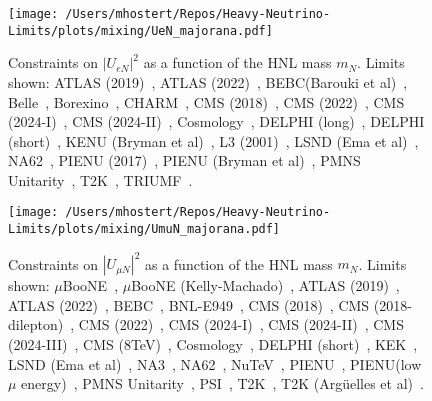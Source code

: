 \documentclass{revtex4-1}%
\begin{document}
%
\normalsize%


\begin{figure}[h!]%
\centering%
\texttt{[image: /Users/mhostert/Repos/Heavy-Neutrino-Limits/plots/mixing/UeN\_majorana.pdf]}%
\caption{Constraints on $|U_{e N}|^2$ as a function of the HNL mass $m_N$. Limits shown: ATLAS (2019)~\cite{ATLAS:2019kpx}, ATLAS (2022)~\cite{ATLAS:2022atq}, BEBC(Barouki et al)~\cite{Barouki:2022bkt}, Belle~\cite{Belle:2013ytx}, Borexino~\cite{Borexino:2013bot}, CHARM~\cite{CHARM:1985nku}, CMS (2018)~\cite{CMS:2018iaf}, CMS (2022)~\cite{CMS:2022fut}, CMS (2024-I)~\cite{CMS:2024ake}, CMS (2024-II)~\cite{CMS:2024xdq}, Cosmology~\cite{Sabti:2020yrt}, DELPHI (long)~\cite{DELPHI:1996qcc}, DELPHI (short)~\cite{DELPHI:1996qcc}, KENU (Bryman et al)~\cite{Bryman:2019bjg}, L3 (2001)~\cite{L3:2001zfe}, LSND (Ema et al)~\cite{Ema:2023buz}, NA62~\cite{NA62:2020mcv}, PIENU (2017)~\cite{PIENU:2017wbj}, PIENU (Bryman et al)~\cite{Bryman:2019bjg}, PMNS Unitarity~\cite{Blennow:2023mqx}, T2K~\cite{T2K:2019jwa}, TRIUMF~\cite{Britton:1992xv}.}%
\end{figure}

%


\begin{figure}[h!]%
\centering%
\texttt{[image: /Users/mhostert/Repos/Heavy-Neutrino-Limits/plots/mixing/UmuN\_majorana.pdf]}%
\caption{Constraints on $|U_{\mu N}|^2$ as a function of the HNL mass $m_N$. Limits shown: $\mu$BooNE~\cite{MicroBooNE:2023icy}, $\mu$BooNE (Kelly-Machado)~\cite{Kelly:2021xbv}, ATLAS (2019)~\cite{ATLAS:2019kpx}, ATLAS (2022)~\cite{ATLAS:2022atq}, BEBC~\cite{WA66:1985mfx}, BNL-E949~\cite{E949:2014gsn}, CMS (2018)~\cite{CMS:2018iaf}, CMS (2018-dilepton)~\cite{CMS:2018jxx}, CMS (2022)~\cite{CMS:2022fut}, CMS (2024-I)~\cite{CMS:2024ake}, CMS (2024-II)~\cite{CMS:2024xdq}, CMS (2024-III)~\cite{CMS:2024ita}, CMS (8TeV)~\cite{CMS:2016aro}, Cosmology~\cite{Sabti:2020yrt}, DELPHI (short)~\cite{DELPHI:1996qcc}, KEK~\cite{Bryman:2019bjg}, LSND (Ema et al)~\cite{Ema:2023buz}, NA3~\cite{NA3:1986ahv}, NA62~\cite{NA62:2021bji}, NuTeV~\cite{NuTeV:1999kej}, PIENU~\cite{PIENU:2019usb}, PIENU(low $\mu$ energy)~\cite{PIENU:2019usb}, PMNS Unitarity~\cite{Blennow:2023mqx}, PSI~\cite{Daum:1987bg}, T2K~\cite{T2K:2019jwa}, T2K (Arg\"uelles et al)~\cite{Arguelles:2021dqn}.}%
\end{figure}

%
\end{document}
